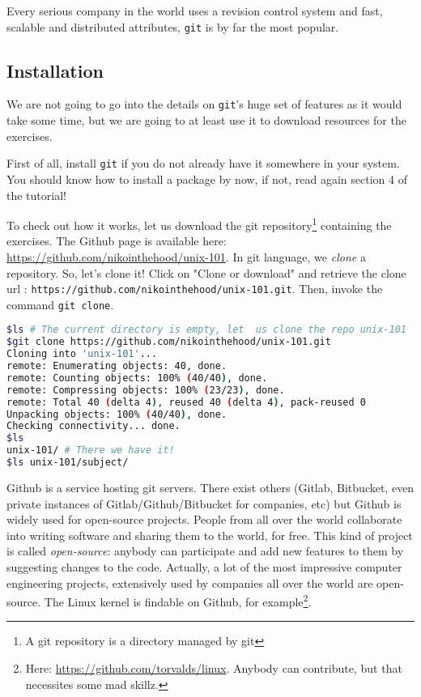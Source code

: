 \documentclass[12pt]{article}
\begin{document}
Every serious company in the world uses a revision control system and fast, scalable and distributed attributes, \texttt{git} is by far the most popular.

\subsection{Installation}

We are not going to go into the details on \texttt{git}'s huge set of features as it would take some time, but we are going to at least use it to download resources for the exercises.

First of all, install \texttt{git} if you do not already have it somewhere in your system. You should know how to install a package by now, if not, read again section 4 of the tutorial!

To check out how it works, let us download the git repository\footnote{A git repository is a directory managed by git} containing the exercises. The Github page is available here: \url{https://github.com/nikointhehood/unix-101}. In git language, we \textit{clone} a repository. So, let's clone it! Click on "Clone or download" and retrieve the clone url : \texttt{https://github.com/nikointhehood/unix-101.git}. Then, invoke the command \texttt{git clone}.

\begin{lstlisting}[language=bash]
$ls # The current directory is empty, let  us clone the repo unix-101
$git clone https://github.com/nikointhehood/unix-101.git
Cloning into 'unix-101'...
remote: Enumerating objects: 40, done.
remote: Counting objects: 100% (40/40), done.
remote: Compressing objects: 100% (23/23), done.
remote: Total 40 (delta 4), reused 40 (delta 4), pack-reused 0
Unpacking objects: 100% (40/40), done.
Checking connectivity... done.
$ls
unix-101/ # There we have it!
$ls unix-101/subject/
\end{lstlisting}

Github is a service hosting git servers. There exist others (Gitlab, Bitbucket, even private instances of Gitlab/Github/Bitbucket for companies, etc) but Github is widely used for open-source projects.
People from all over the world collaborate into writing software and sharing them to the world, for free. This kind of project is called \textit{open-source}: anybody can participate and add new features to them by suggesting changes to the code.
Actually, a lot of the most impressive computer engineering projects, extensively used by companies all over the world are open-source. The Linux kernel is findable on Github, for example\footnote{Here: \url{https://github.com/torvalds/linux}. Anybody can contribute, but that necessites some mad skillz.}.
\end{document}

